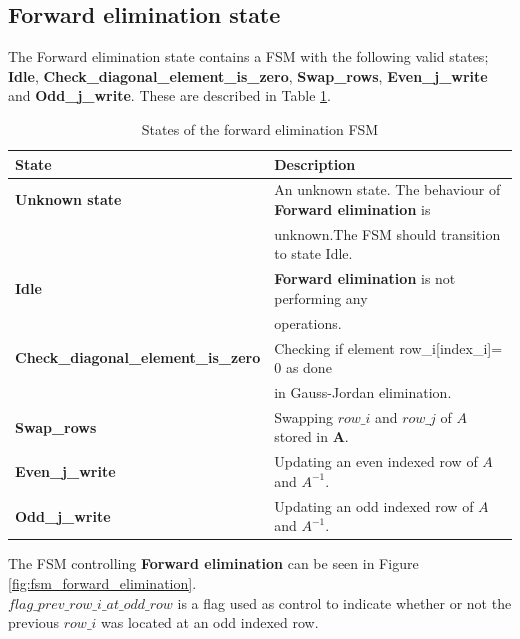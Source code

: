 \subsection{Forward elimination state}
The Forward elimination state contains a FSM with the following valid states; \textbf{Idle}, \textbf{Check\_diagonal\_element\_is\_zero}, \textbf{Swap\_rows}, \textbf{Even\_j\_write} and \textbf{Odd\_j\_write}. These are described in Table \ref{tab:fsm_forward_elimination}.

\begin{table}[H]
\centering
 \resizebox{1.\textwidth}{!}
{\begin{tabular}{l|l}
State                                                                                    & Description                                                                                   \\
\hline
\textbf{Unknown state}                                                                   & An unknown state. The behaviour of \textbf{Forward elimination} is \\ 
&unknown.The FSM should transition to state Idle.                                    \\
\textbf{Idle}                                                                            & \textbf{Forward elimination} is not performing any                                           \\
&operations.\\
\textbf{Check\_diagonal\_element\_is\_zero} & Checking if element row\_i[index\_i]= 0 as done\\ 
&in Gauss-Jordan elimination.     \\
\textbf{Swap\_rows}                                                            & Swapping $row\_i$ and $row\_j$ of  $A$ stored in \textbf{A}.        \\
\textbf{Even\_j\_write}                                                           & Updating an even indexed row of  $A$ and $A^{-1}$.       \\
\textbf{Odd\_j\_write}                                                                  & Updating an odd indexed row of  $A$ and $A^{-1}$.   
\end{tabular}}
\caption{States of the forward elimination FSM}
\label{tab:fsm_forward_elimination}

\end{table}


The FSM controlling \textbf{Forward elimination} can be seen in Figure \ref{fig:fsm_forward_elimination}.\\ $flag\_prev\_row\_i\_at\_odd\_row$ is a flag used as control to indicate whether or not the previous $row\_i$ was located at an odd indexed row. 



